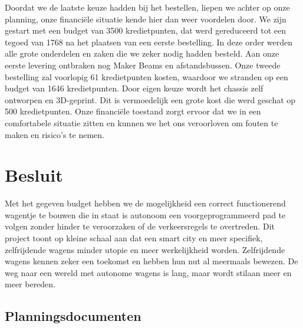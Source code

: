 \documentclass[a4paper,kulak]{kulakarticle}
\begin{document}
Doordat we de laatste keuze hadden bij het bestellen, liepen we achter op onze planning, onze financiële situatie kende hier dan weer voordelen door. We zijn gestart met een budget van 3500 kredietpunten, dat werd gereduceerd tot een tegoed van 1768 na het plaatsen van een eerste bestelling. In deze  order werden alle grote onderdelen en zaken die we zeker nodig hadden besteld.  Aan onze eerste levering ontbraken nog Maker Beams en afstandsbussen. Onze tweede bestelling zal voorlopig 61 kredietpunten kosten, waardoor we stranden op een budget van 1646 kredietpunten. Door eigen keuze wordt het chassis zelf ontworpen en 3D-geprint. Dit is vermoedelijk een grote kost die werd geschat op 500 kredietpunten. Onze financiële toestand zorgt ervoor dat we in een comfortabele situatie zitten en kunnen we het ons veroorloven om fouten te maken en risico's te nemen. 


\section{Besluit}


Met het gegeven budget hebben we de mogelijkheid een correct functionerend wagentje te bouwen die in staat is autonoom een voorgeprogrammeerd pad te volgen zonder hinder te veroorzaken of de verkeersregels te overtreden. Dit project toont op kleine schaal aan dat een smart city en meer specifiek, zelfrijdende wagens minder utopie en meer werkelijkheid worden.
Zelfrijdende wagens kennen zeker een toekomst en hebben hun nut al meermaals bewezen. De weg naar een wereld met autonome wagens is lang, maar wordt stilaan meer en meer bereden.



\begin{appendices}
	\section*{Planningsdocumenten} %
	\renewcommand\refname{} %
	\vspace{-2\bigskipamount} %
	







\end{appendices}
\end{document}
